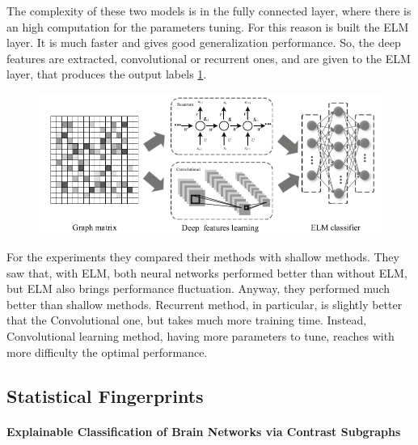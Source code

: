 The complexity of these two models is in the fully connected layer, where there is an high computation for the parameters tuning. For this reason is built the ELM layer. It is much faster and gives good generalization performance. So, the deep features are extracted, convolutional or recurrent ones, and are given to the ELM layer, that produces the output labels \ref{fig:diagram10}. 

\begin{figure}[htbp]
	\centering
	\includegraphics[scale=0.5]{Immagini/functional3.PNG}
	\caption{\label{fig:diagram10}}
\end{figure}

For the experiments they compared their methods with shallow methods. They saw that, with ELM, both neural networks performed better than without ELM, but ELM also brings performance fluctuation. Anyway, they performed much better than shallow methods. Recurrent method, in particular, is slightly better that the Convolutional one, but takes much more training time. Instead, Convolutional learning method, having more parameters to tune, reaches with more difficulty the optimal performance.

\subsection{Statistical Fingerprints}
\paragraph{Explainable Classification of Brain Networks via Contrast Subgraphs}\
\\

